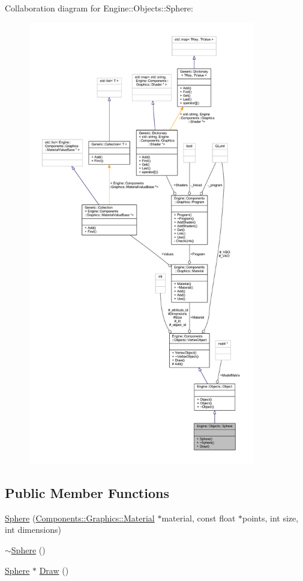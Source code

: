 Collaboration diagram for Engine\+:\+:Objects\+:\+:Sphere\+:
\nopagebreak
\begin{figure}[H]
\begin{center}
\leavevmode
\includegraphics[height=550pt]{classEngine_1_1Objects_1_1Sphere__coll__graph}
\end{center}
\end{figure}
\subsection*{Public Member Functions}
\begin{DoxyCompactItemize}
\item 
\mbox{\hyperlink{classEngine_1_1Objects_1_1Sphere_a88f7519c022db552a6b4fa8e07d7718f}{Sphere}} (\mbox{\hyperlink{classEngine_1_1Components_1_1Graphics_1_1Material}{Components\+::\+Graphics\+::\+Material}} $\ast$material, const float $\ast$points, int size, int dimensions)
\item 
\mbox{\hyperlink{classEngine_1_1Objects_1_1Sphere_ae305cb7304701062e6930a6c48dd6d97}{$\sim$\+Sphere}} ()
\item 
\mbox{\hyperlink{classEngine_1_1Objects_1_1Sphere}{Sphere}} $\ast$ \mbox{\hyperlink{classEngine_1_1Objects_1_1Sphere_a7cc1ef27c2634c763273ed84065b217a}{Draw}} ()
\end{DoxyCompactItemize}
